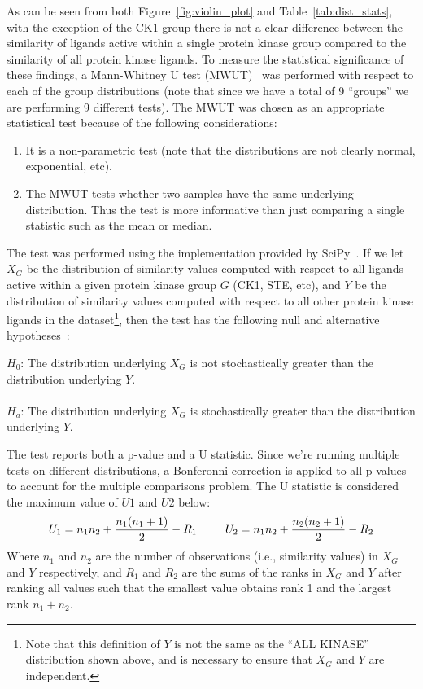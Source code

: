 \documentclass[11pt]{article}
\begin{document}
As can be seen from both Figure~\ref{fig:violin_plot} and Table~\ref{tab:dist_stats}, with the exception of the CK1 group there is not a clear difference between the similarity of ligands active within a single protein kinase group compared to the similarity of all protein kinase ligands. 
To measure the statistical significance of these findings, a Mann-Whitney U test (MWUT)~\cite{mann_whitney_1947} was performed with respect to each of the group distributions (note that since we have a total of 9 ``groups'' we are performing 9 different tests). 
The MWUT was chosen as an appropriate statistical test because of the following considerations:
\begin{enumerate}
    \item It is a non-parametric test (note that the distributions are not clearly normal, exponential, etc).
    \item The MWUT tests whether two samples have the same underlying distribution. Thus the test is more informative than just comparing a single statistic such as the mean or median. 
\end{enumerate}
The test was performed using the implementation provided by SciPy~\cite{scipy_2020,scipy_manual_2025}. 
If we let $X_G$ be the distribution of similarity values computed with respect to all ligands active within a given protein kinase group $G$ (CK1, STE, etc), and $Y$ be the distribution of similarity values computed with respect to all other protein kinase ligands in the dataset\footnote{Note that this definition of $Y$ is not the same as the ``ALL KINASE'' distribution shown above, and is necessary to ensure that $X_G$ and $Y$ are independent.}, then the test has the following null and alternative hypotheses~\cite{scipy_manual_2025}:\\
\begin{adjustwidth}{2.5em}{0pt}
$H_0$: The distribution underlying $X_G$ is not stochastically greater than the distribution underlying $Y$.\\\\
$H_a$: The distribution underlying $X_G$ is stochastically greater than the distribution underlying $Y$.\\
\end{adjustwidth}
\noindent
The test reports both a p-value and a U statistic. Since we're running multiple tests on different distributions, a Bonferonni correction is applied to all p-values to account for the multiple comparisons problem. 
The U statistic is considered the maximum value of $U1$ and $U2$ below:
\begin{equation}
U_1 = n_1n_2 + \frac{n_1(n_1+1)}{2}- R_1 \;\;\;\;\;\;\;\;\; U_2 = n_1n_2 + \frac{n_2(n_2+1)}{2}- R_2 \\
\end{equation}
Where $n_1$ and $n_2$ are the number of observations (i.e., similarity values) in $X_G$ and $Y$ respectively, and $R_1$ and $R_2$ are the sums of the ranks in $X_G$ and $Y$ after ranking all values such that the smallest value obtains rank 1 and the largest rank $n_1 + n_2$. 
\end{document}
